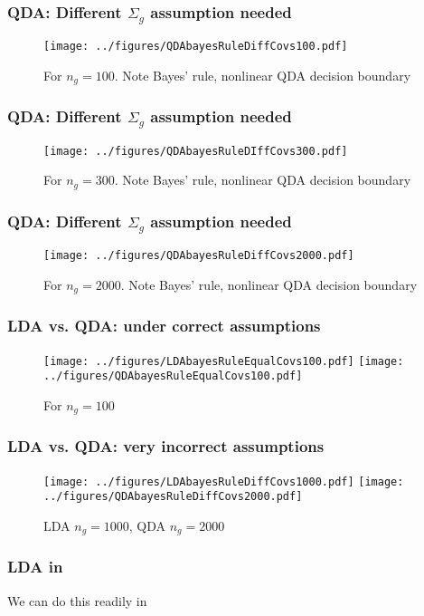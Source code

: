 \documentclass[12pt]{beamer}
\begin{document}
\begin{frame}[fragile]
\frametitle{QDA: Different $\Sigma_g$ assumption needed}
\begin{figure}
\centering
\texttt{[image: ../figures/QDAbayesRuleDiffCovs100.pdf]}
\caption{For $n_g = 100$.  Note  Bayes' rule, nonlinear QDA decision boundary}
\end{figure}
\end{frame}


\begin{frame}[fragile]
\frametitle{QDA: Different $\Sigma_g$ assumption needed}
\begin{figure}
\centering
\texttt{[image: ../figures/QDAbayesRuleDIffCovs300.pdf]}
\caption{For $n_g = 300$.  Note  Bayes' rule, nonlinear QDA decision boundary}
\end{figure}
\end{frame}

\begin{frame}[fragile]
\frametitle{QDA: Different $\Sigma_g$ assumption needed}
\begin{figure}
\centering
\texttt{[image: ../figures/QDAbayesRuleDiffCovs2000.pdf]}
\caption{For $n_g = 2000$.  Note  Bayes' rule, nonlinear QDA decision boundary}
\end{figure}
\end{frame}


\begin{frame}[fragile]
\frametitle{LDA vs. QDA: under correct assumptions}
\begin{figure}
\centering
\texttt{[image: ../figures/LDAbayesRuleEqualCovs100.pdf]}
\texttt{[image: ../figures/QDAbayesRuleEqualCovs100.pdf]}
\caption{For $n_g = 100$}
\end{figure}
\end{frame}

\begin{frame}[fragile]
\frametitle{LDA vs. QDA: very incorrect assumptions}
\begin{figure}
\centering
\texttt{[image: ../figures/LDAbayesRuleDiffCovs1000.pdf]}
\texttt{[image: ../figures/QDAbayesRuleDiffCovs2000.pdf]}
\caption{LDA $n_g = 1000$, QDA $n_g = 2000$}
\end{figure}
\end{frame}



\begin{frame}[fragile]
\frametitle{LDA in }
We can do this readily in 

\vsp
{}
\end{frame}
\end{document}
